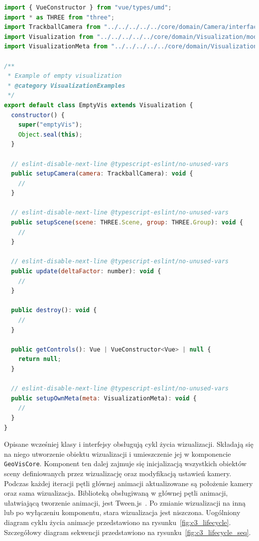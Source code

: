 \begin{samepage}
    \begin{lstlisting}[float, language=javascript, label={lst:vis}, caption={Pusta  klasa wizualizacji \texttt{EmptyVis} rozszerzająca klasę \texttt{Visualization}}]
import { VueConstructor } from "vue/types/umd";
import * as THREE from "three";
import TrackballCamera from "../../../../../core/domain/Camera/interfaces/TrackballCamera";
import Visualization from "../../../../../core/domain/Visualization/models/Visualization";
import VisualizationMeta from "../../../../../core/domain/Visualization/models/VisualizationMeta";

/**
 * Example of empty visualization
 * @category VisualizationExamples
 */
export default class EmptyVis extends Visualization {
  constructor() {
    super("emptyVis");
    Object.seal(this);
  }

  // eslint-disable-next-line @typescript-eslint/no-unused-vars
  public setupCamera(camera: TrackballCamera): void {
    //
  }

  // eslint-disable-next-line @typescript-eslint/no-unused-vars
  public setupScene(scene: THREE.Scene, group: THREE.Group): void {
    //
  }

  // eslint-disable-next-line @typescript-eslint/no-unused-vars
  public update(deltaFactor: number): void {
    //
  }

  public destroy(): void {
    //
  }

  public getControls(): Vue | VueConstructor<Vue> | null {
    return null;
  }

  // eslint-disable-next-line @typescript-eslint/no-unused-vars
  public setupOwnMeta(meta: VisualizationMeta): void {
    //
  }
}
    \end{lstlisting}
\end{samepage}

Opisane wcześniej klasy i interfejsy obsługują cykl życia wizualizacji. Składają się na niego utworzenie obiektu wizualizacji i umieszczenie jej w komponencie \texttt{GeoVisCore}. Komponent ten dalej zajmuje się inicjalizacją wszystkich obiektów sceny definiowanych przez wizualizację oraz modyfikacją ustawień kamery. Podczas każdej iteracji pętli głównej animacji aktualizowane są położenie kamery oraz sama wizualizacja. Biblioteką obsługiwaną w głównej pętli animacji, ułatwiającą tworzenie animacji, jest Tween.js~\cite{TWEEN}. Po zmianie wizualizacji na inną lub po wyłączeniu komponentu, stara wizualizacja jest niszczona. Uogólniony diagram cyklu życia animacje przedstawiono na rysunku~\ref{fig:c3_lifecycle}. Szczegółowy diagram sekwencji przedstawiono na rysunku~\ref{fig:c3_lifecycle_seq}. 

